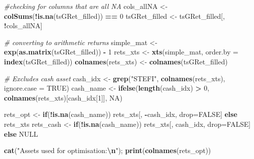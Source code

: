 \documentclass[
  12pt,
]{article}
\newenvironment{Shaded}{\begin{snugshade}}{\end{snugshade}}
\newcommand{\AttributeTok}[1]{\textcolor[rgb]{0.13,0.29,0.53}{#1}}
\newcommand{\CommentTok}[1]{\textcolor[rgb]{0.56,0.35,0.01}{\textit{#1}}}
\newcommand{\ConstantTok}[1]{\textcolor[rgb]{0.56,0.35,0.01}{#1}}
\newcommand{\ControlFlowTok}[1]{\textcolor[rgb]{0.13,0.29,0.53}{\textbf{#1}}}
\newcommand{\DecValTok}[1]{\textcolor[rgb]{0.00,0.00,0.81}{#1}}
\newcommand{\FunctionTok}[1]{\textcolor[rgb]{0.13,0.29,0.53}{\textbf{#1}}}
\newcommand{\NormalTok}[1]{#1}
\newcommand{\OtherTok}[1]{\textcolor[rgb]{0.56,0.35,0.01}{#1}}
\newcommand{\SpecialCharTok}[1]{\textcolor[rgb]{0.81,0.36,0.00}{\textbf{#1}}}
\newcommand{\StringTok}[1]{\textcolor[rgb]{0.31,0.60,0.02}{#1}}
\begin{document}
\begin{Shaded}
\begin{Highlighting}[]
\CommentTok{\#checking for columns that are all NA}
\NormalTok{cols\_allNA }\OtherTok{\textless{}{-}} \FunctionTok{colSums}\NormalTok{(}\SpecialCharTok{!}\FunctionTok{is.na}\NormalTok{(tsGRet\_filled)) }\SpecialCharTok{==} \DecValTok{0}
\NormalTok{tsGRet\_filled }\OtherTok{\textless{}{-}}\NormalTok{ tsGRet\_filled[, }\SpecialCharTok{!}\NormalTok{cols\_allNA]}

\CommentTok{\# converting to arithmetic returns}
\NormalTok{simple\_mat }\OtherTok{\textless{}{-}} \FunctionTok{exp}\NormalTok{(}\FunctionTok{as.matrix}\NormalTok{(tsGRet\_filled)) }\SpecialCharTok{{-}} \DecValTok{1}
\NormalTok{rets\_xts }\OtherTok{\textless{}{-}} \FunctionTok{xts}\NormalTok{(simple\_mat, }\AttributeTok{order.by =} \FunctionTok{index}\NormalTok{(tsGRet\_filled))}
\FunctionTok{colnames}\NormalTok{(rets\_xts) }\OtherTok{\textless{}{-}} \FunctionTok{colnames}\NormalTok{(tsGRet\_filled)}

\CommentTok{\# Excludes cash asset}
\NormalTok{cash\_idx }\OtherTok{\textless{}{-}} \FunctionTok{grep}\NormalTok{(}\StringTok{"STEFI"}\NormalTok{, }\FunctionTok{colnames}\NormalTok{(rets\_xts), }\AttributeTok{ignore.case =} \ConstantTok{TRUE}\NormalTok{)}
\NormalTok{cash\_name }\OtherTok{\textless{}{-}} \FunctionTok{ifelse}\NormalTok{(}\FunctionTok{length}\NormalTok{(cash\_idx) }\SpecialCharTok{\textgreater{}} \DecValTok{0}\NormalTok{, }\FunctionTok{colnames}\NormalTok{(rets\_xts)[cash\_idx[}\DecValTok{1}\NormalTok{]], }\ConstantTok{NA}\NormalTok{)}

\NormalTok{rets\_opt }\OtherTok{\textless{}{-}} \ControlFlowTok{if}\NormalTok{(}\SpecialCharTok{!}\FunctionTok{is.na}\NormalTok{(cash\_name)) rets\_xts[, }\SpecialCharTok{{-}}\NormalTok{cash\_idx, drop}\OtherTok{=}\ConstantTok{FALSE}\NormalTok{] }\ControlFlowTok{else}\NormalTok{ rets\_xts}
\NormalTok{rets\_cash }\OtherTok{\textless{}{-}} \ControlFlowTok{if}\NormalTok{(}\SpecialCharTok{!}\FunctionTok{is.na}\NormalTok{(cash\_name)) rets\_xts[, cash\_idx, drop}\OtherTok{=}\ConstantTok{FALSE}\NormalTok{] }\ControlFlowTok{else} \ConstantTok{NULL}

\FunctionTok{cat}\NormalTok{(}\StringTok{"Assets used for optimisation:}\SpecialCharTok{\textbackslash{}n}\StringTok{"}\NormalTok{); }\FunctionTok{print}\NormalTok{(}\FunctionTok{colnames}\NormalTok{(rets\_opt))}
\end{Highlighting}
\end{Shaded}
\end{document}
